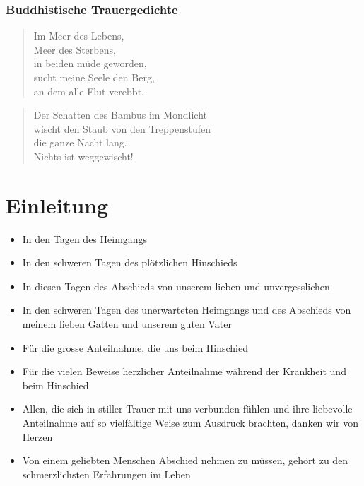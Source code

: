 \documentclass[ngerman,a4paper,11pt]{scrreprt}
\begin{document}
\subsubsection*{Buddhistische Trauergedichte}
\label{sec-2-1-2-4-3}

\begin{verse}
Im Meer des Lebens, \\
Meer des Sterbens, \\
in beiden müde geworden, \\
sucht meine Seele den Berg, \\
an dem alle Flut verebbt. \\
\end{verse}

\begin{verse}
Der Schatten des Bambus im Mondlicht \\
wischt den Staub von den Treppenstufen \\
die ganze Nacht lang. \\
Nichts ist weggewischt! \\
\end{verse}

\section{Einleitung}
\label{sec-2-1-3}

\begin{itemize}
\item In den Tagen des Heimgangs
\item In den schweren Tagen des plötzlichen Hinschieds
\item In diesen Tagen des Abschieds von unserem lieben und unvergesslichen
\item In den schweren Tagen des unerwarteten Heimgangs und des Abschieds von
meinem lieben Gatten und unserem guten Vater
\item Für die grosse Anteilnahme, die uns beim Hinschied
\item Für die vielen Beweise herzlicher Anteilnahme während der Krankheit und
beim Hinschied
\item Allen, die sich in stiller Trauer mit uns verbunden fühlen und ihre
liebevolle Anteilnahme auf so vielfältige Weise zum Ausdruck brachten,
danken wir von Herzen
\item Von einem geliebten Menschen Abschied nehmen zu müssen, gehört zu den
schmerzlichsten Erfahrungen im Leben
\end{itemize}
\end{document}
